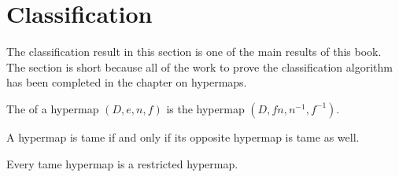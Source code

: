 
\section{Classification}
\label{sec:proof-classification}

\label{sec:classification}

The classification result in this section is one of the main results of this book.
The section is short because all of the work to prove the classification algorithm
has been completed in the chapter on hypermaps.


\begin{definition}[opposite]
The  of a hypermap $(D,e,n,f)$ is the
hypermap $(D,f n,n^{-1},f^{-1})$.
%
\end{definition}

\begin{lemma}[]
A hypermap is tame if and only if its opposite hypermap is tame as well.
\end{lemma}

\begin{lemma}[]\cutrate{}
Every tame hypermap is a restricted hypermap.
\end{lemma}

